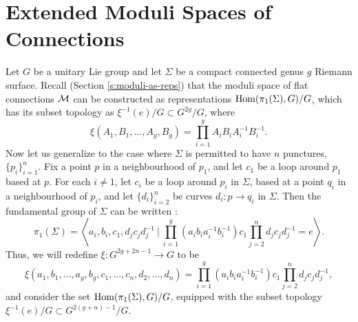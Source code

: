 	
	
	\section{Extended Moduli Spaces of Connections}
	Let $G$ be a unitary Lie group and let $\Sigma$ be a compact connected genus $g$ Riemann surface. Recall (Section \ref{s:moduli-as-reps}) that the moduli space of flat connections $\mathcal{M}$ can be constructed as representations $\text{Hom}(\pi_1(\Sigma),G)/G$, which has its subset topology as $\xi^{-1}(e)/G \subset G^{2g}/G$, where 
	\begin{equation}
		\xi(A_1,B_1,...,A_g,B_g) = \prod_{i=1}^g A_iB_iA_i^{-1}B_i^{-1}.
	\end{equation} 
	Now let us generalize to the case where $\Sigma$ is permitted to have $n$ punctures, $\{p_i\}_{i=1}^n$. Fix a point $p$ in a neighbourhood of $p_1$, and let $c_1$ be a loop around $p_1$ based at $p$. For each $i\neq 1$, let $c_i$ be a loop around $p_i$ in $\Sigma$, based at a point $q_i$ in a neighbourhood of $p_i$, and let $\{d_i\}_{i=2}^n$ be curves $d_i:p\to q_i$ in $\Sigma$. Then the fundamental group of $\Sigma$ can be written \cite[Eqn. 2.2]{hurtubise_representations_2000}:
	\begin{equation}
		\pi_1(\Sigma) = \left\langle a_i, b_i, c_1, d_jc_jd_j^{-1} ~\bigg|~ \prod_{i=1}^{g}(a_ib_ia_i^{-1}b_i^{-1})c_1\prod_{j=2}^{n}d_jc_jd_j^{-1}=e\right\rangle.
	\end{equation}
	Thus, we will redefine $\xi:G^{2g+2n-1}\to G$ to be
	\begin{equation}
		\xi(a_1,b_1,...,a_g,b_g,c_1,...,c_n,d_2,...,d_n) = \prod_{i=1}^{g}(a_ib_ia_i^{-1}b_i^{-1})c_1\prod_{j=2}^{n}d_jc_jd_j^{-1},
	\end{equation}
	and consider the set $\text{Hom}(\pi_1(\Sigma),G)/G$, equipped with the subset topology $\xi^{-1}(e)/G\subset G^{2(g+n)-1}/G$.
	
